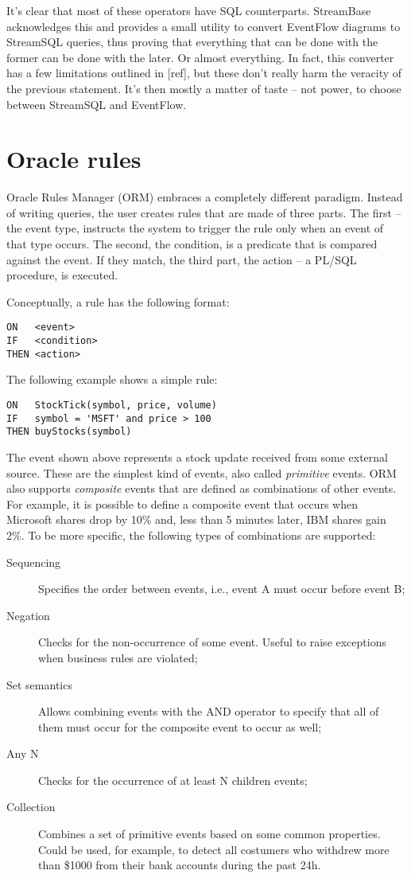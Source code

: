\documentclass{report}
\begin{document}
It's clear that most of these operators have SQL
counterparts. StreamBase acknowledges this and provides a small
utility to convert EventFlow diagrams to StreamSQL queries, thus
proving that everything that can be done with the former can be done
with the later. Or almost everything. In fact, this converter has a
few limitations outlined in [ref], but these don't really harm the
veracity of the previous statement. It's then mostly a matter of taste
-- not power, to choose between StreamSQL and EventFlow.

\section{Oracle rules}

Oracle Rules Manager (ORM) embraces a completely different
paradigm. Instead of writing queries, the user creates rules that are
made of three parts. The first -- the event type, instructs the system
to trigger the rule only when an event of that type occurs. The
second, the condition, is a predicate that is compared against the
event. If they match, the third part, the action -- a PL/SQL
procedure, is executed.

Conceptually, a rule has the following format:

\begin{verbatim}
ON   <event>
IF   <condition>
THEN <action>
\end{verbatim}

The following example shows a simple rule:

\begin{verbatim}
ON   StockTick(symbol, price, volume)
IF   symbol = 'MSFT' and price > 100
THEN buyStocks(symbol)
\end{verbatim}

The event shown above represents a stock update received from some
external source. These are the simplest kind of events, also called
\emph{primitive} events. ORM also supports \emph{composite} events
that are defined as combinations of other events. For example, it is
possible to define a composite event that occurs when Microsoft shares
drop by 10\% and, less than 5 minutes later, IBM shares gain 2\%. To
be more specific, the following types of combinations are supported:
\begin{description}
\item [Sequencing] Specifies the order between events, i.e., event A
  must occur before event B;
\item [Negation] Checks for the non-occurrence of some event. Useful
  to raise exceptions when business rules are violated;
\item [Set semantics] Allows combining events with the AND operator to
  specify that all of them must occur for the composite event to occur
  as well;
\item [Any N] Checks for the occurrence of at least N children events;
\item [Collection] Combines a set of primitive events based on some
  common properties. Could be used, for example, to detect all
  costumers who withdrew more than \$1000 from their bank accounts
  during the past 24h.
\end{description}
\end{document}
